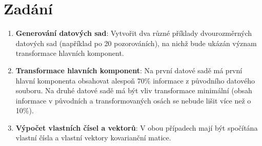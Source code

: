 \section{Zadání}

\begin{enumerate}
    \item \textbf{Generování datových sad}: Vytvořit dva různé příklady dvourozměrných datových sad (například po 20 pozorováních), na nichž bude ukázán význam transformace hlavních komponent.
    \item \textbf{Transformace hlavních komponent}: Na první datové sadě má první hlavní komponenta obsahovat alespoň 70\% informace z původního datového souboru. Na druhé datové sadě má být vliv transformace minimální (obsah informace v původních a transformovaných osách se nebude lišit více než o 10\%).
    \item \textbf{Výpočet vlastních čísel a vektorů}: V obou případech mají být spočítána vlastní čísla a vlastní vektory kovarianční matice.
\end{enumerate}
